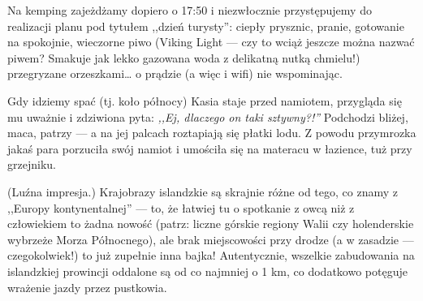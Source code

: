 
Na kemping zajeżdżamy dopiero o 17:50 i niezwłocznie przystępujemy do realizacji planu pod tytułem ,,dzień turysty'': ciepły prysznic, pranie, gotowanie na spokojnie, wieczorne piwo (Viking Light --- czy to wciąż jeszcze można nazwać piwem? Smakuje jak lekko gazowana woda z delikatną nutką chmielu!) przegryzane orzeszkami… o prądzie (a więc i wifi) nie wspominając.

Gdy idziemy spać (tj. koło północy) Kasia staje przed namiotem, przygląda się mu uważnie i zdziwiona pyta: \emph{,,Ej, dlaczego on taki sztywny?!''} Podchodzi bliżej, maca, patrzy --- a na jej palcach roztapiają się płatki lodu. Z powodu przymrozka jakaś para porzuciła swój namiot i umościła się na materacu  w łazience, tuż przy grzejniku.


(Luźna impresja.) Krajobrazy islandzkie są skrajnie różne od tego, co znamy z ,,Europy kontynentalnej'' --- to, że łatwiej tu o spotkanie z owcą niż z człowiekiem to żadna nowość (patrz: liczne górskie regiony Walii czy holenderskie wybrzeże Morza Północnego), ale brak miejscowości przy drodze (a w zasadzie --- czegokolwiek!) to już zupełnie inna bajka! Autentycznie, wszelkie zabudowania na islandzkiej prowincji oddalone są od  co najmniej o 1 km, co dodatkowo potęguje wrażenie jazdy przez pustkowia.


